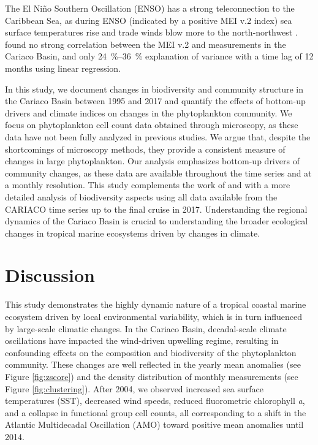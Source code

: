     The El Niño Southern Oscillation (ENSO) has a strong teleconnection to the Caribbean Sea, as during ENSO (indicated by a positive MEI v.2 index) sea surface temperatures rise and trade winds blow more to the north-northwest \cite{enfield_tropical_1997}.  found no strong correlation between the MEI v.2 and measurements in the Cariaco Basin, and only \qtyrange{24}{36}{\%} explanation of variance with a time lag of 12 months using linear regression.

    In this study, we document changes in biodiversity and community structure in the Cariaco Basin between 1995 and 2017 and quantify the effects of bottom-up drivers and climate indices on changes in the phytoplankton community. We focus on phytoplankton cell count data obtained through microscopy, as these data have not been fully analyzed in previous studies. We argue that, despite the shortcomings of microscopy methods, they provide a consistent measure of changes in large phytoplankton. Our analysis emphasizes bottom-up drivers of community changes, as these data are available throughout the time series and at a monthly resolution. This study complements the work of  and  with a more detailed analysis of biodiversity aspects using all data available from the CARIACO time series up to the final cruise in 2017. Understanding the regional dynamics of the Cariaco Basin is crucial to understanding the broader ecological changes in tropical marine ecosystems driven by changes in climate. 







\section{Discussion}

This study demonstrates the highly dynamic nature of a tropical coastal marine ecosystem driven by local environmental variability, which is in turn influenced by large-scale climatic changes. In the Cariaco Basin, decadal-scale climate oscillations have impacted the wind-driven upwelling regime, resulting in confounding effects on the composition and biodiversity of the phytoplankton community.
These changes are well reflected in the yearly mean anomalies (see Figure \ref{fig:zscore}) and the density distribution of monthly measurements (see Figure \ref{fig:clustering}). After 2004, we observed increased sea surface temperatures (SST), decreased wind speeds, reduced fluorometric chlorophyll \textit{a}, and a collapse in functional group cell counts, all corresponding to a shift in the Atlantic Multidecadal Oscillation (AMO) toward positive mean anomalies until 2014. 

